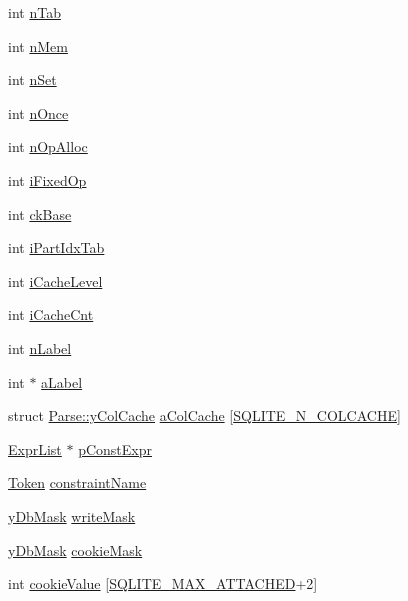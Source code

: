 \begin{DoxyCompactItemize}
int \hyperlink{struct_parse_ad80776c870a2ec9334ba0d32de602aa4}{n\+Tab}
\item 
int \hyperlink{struct_parse_a857d199d972b4d3864ce420c143508e4}{n\+Mem}
\item 
int \hyperlink{struct_parse_a46b5e828fc2b936c5f110ed39acbab4c}{n\+Set}
\item 
int \hyperlink{struct_parse_a8b26e5a5e9547ab221d19c9e5c56f174}{n\+Once}
\item 
int \hyperlink{struct_parse_aefbb8e03fd662e3f265fd1500454c7b0}{n\+Op\+Alloc}
\item 
int \hyperlink{struct_parse_af657414acf52d6c2f3b80cecb27a7039}{i\+Fixed\+Op}
\item 
int \hyperlink{struct_parse_a199c7e2d7e263358656b2cbea891ed79}{ck\+Base}
\item 
int \hyperlink{struct_parse_afa0328857cc33ca8154f18fdcabe1493}{i\+Part\+Idx\+Tab}
\item 
int \hyperlink{struct_parse_a267ccb9cdda746f8e4ac595057806893}{i\+Cache\+Level}
\item 
int \hyperlink{struct_parse_a0336978d6835b35b995c8e5d9420617a}{i\+Cache\+Cnt}
\item 
int \hyperlink{struct_parse_af5a14ba3fa9c2cb9827402a81a53a986}{n\+Label}
\item 
int $\ast$ \hyperlink{struct_parse_a5ba7d7db3dd21c05465292dbc43abf68}{a\+Label}
\item 
struct \hyperlink{struct_parse_1_1y_col_cache}{Parse\+::y\+Col\+Cache} \hyperlink{struct_parse_ad38afd0aaa16c8a42be41d57b244c755}{a\+Col\+Cache} \mbox{[}\hyperlink{sqlite3_8c_a93bdf7a445214ebff384cce4c990a078}{S\+Q\+L\+I\+T\+E\+\_\+\+N\+\_\+\+C\+O\+L\+C\+A\+C\+H\+E}\mbox{]}
\item 
\hyperlink{struct_expr_list}{Expr\+List} $\ast$ \hyperlink{struct_parse_a15a4706ea881fbe875ab67f3ebd5f952}{p\+Const\+Expr}
\item 
\hyperlink{struct_token}{Token} \hyperlink{struct_parse_ae7b8e7eeb5898d90d0b59cd04c9302ab}{constraint\+Name}
\item 
\hyperlink{sqlite3_8c_aa9f65e0e36379aa834aac7932ba91bc3}{y\+Db\+Mask} \hyperlink{struct_parse_a034fad25a08bebdfcb10fd5ef97010a9}{write\+Mask}
\item 
\hyperlink{sqlite3_8c_aa9f65e0e36379aa834aac7932ba91bc3}{y\+Db\+Mask} \hyperlink{struct_parse_a83a8d0c8ab1f8283a1023308a2b63e36}{cookie\+Mask}
\item 
int \hyperlink{struct_parse_a74ad814028af05ec5642589b5fffcc35}{cookie\+Value} \mbox{[}\hyperlink{sqlite3_8c_ac6ac68ce9bff1bc9d8018890df9f45c4}{S\+Q\+L\+I\+T\+E\+\_\+\+M\+A\+X\+\_\+\+A\+T\+T\+A\+C\+H\+E\+D}+2\mbox{]}

\end{DoxyCompactItemize}
